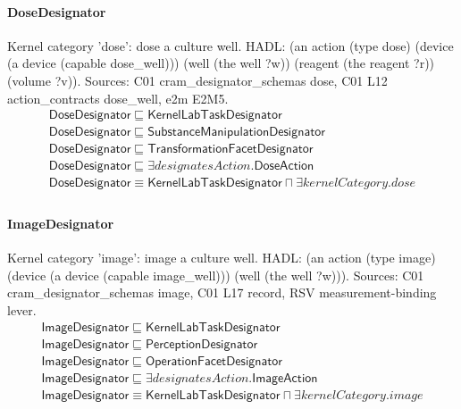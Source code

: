 \documentclass[10pt]{article}
\begin{document}
\paragraph{DoseDesignator} Kernel category 'dose': dose a culture well. HADL: (an action (type dose) (device (a device (capable dose\_well))) (well (the well ?w)) (reagent (the reagent ?r)) (volume ?v)). Sources: C01 cram\_designator\_schemas dose, C01 L12 action\_contracts dose\_well, e2m E2M5.
\[\begin{array}{l}
\mathsf{DoseDesignator} \sqsubseteq  \mathsf{KernelLabTaskDesignator} \\
\mathsf{DoseDesignator} \sqsubseteq  \mathsf{SubstanceManipulationDesignator} \\
\mathsf{DoseDesignator} \sqsubseteq  \mathsf{TransformationFacetDesignator} \\
\mathsf{DoseDesignator} \sqsubseteq  \exists \mathit{designatesAction}.\mathsf{DoseAction} \\
\mathsf{DoseDesignator} \equiv  \mathsf{KernelLabTaskDesignator} \sqcap  \exists \mathit{kernelCategory}.{dose} \\
\end{array}\]
\paragraph{ImageDesignator} Kernel category 'image': image a culture well. HADL: (an action (type image) (device (a device (capable image\_well))) (well (the well ?w))). Sources: C01 cram\_designator\_schemas image, C01 L17 record, RSV measurement-binding lever.
\[\begin{array}{l}
\mathsf{ImageDesignator} \sqsubseteq  \mathsf{KernelLabTaskDesignator} \\
\mathsf{ImageDesignator} \sqsubseteq  \mathsf{PerceptionDesignator} \\
\mathsf{ImageDesignator} \sqsubseteq  \mathsf{OperationFacetDesignator} \\
\mathsf{ImageDesignator} \sqsubseteq  \exists \mathit{designatesAction}.\mathsf{ImageAction} \\
\mathsf{ImageDesignator} \equiv  \mathsf{KernelLabTaskDesignator} \sqcap  \exists \mathit{kernelCategory}.{image} \\
\end{array}\]
\end{document}
